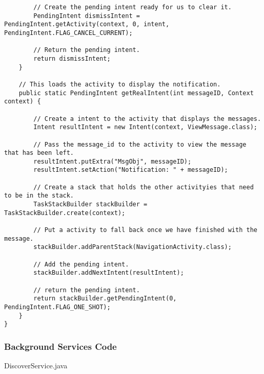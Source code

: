 \begin{lstlisting}
        // Create the pending intent ready for us to clear it.
        PendingIntent dismissIntent = PendingIntent.getActivity(context, 0, intent, PendingIntent.FLAG_CANCEL_CURRENT);

        // Return the pending intent.
        return dismissIntent;
    }

    // This loads the activity to display the notification.
    public static PendingIntent getRealIntent(int messageID, Context context) {

        // Create a intent to the activity that displays the messages.
        Intent resultIntent = new Intent(context, ViewMessage.class);

        // Pass the message_id to the activity to view the message that has been left.
        resultIntent.putExtra("MsgObj", messageID);
        resultIntent.setAction("Notification: " + messageID);

        // Create a stack that holds the other activityies that need to be in the stack.
        TaskStackBuilder stackBuilder = TaskStackBuilder.create(context);

        // Put a activity to fall back once we have finished with the message.
        stackBuilder.addParentStack(NavigationActivity.class);

        // Add the pending intent.
        stackBuilder.addNextIntent(resultIntent);

        // return the pending intent.
        return stackBuilder.getPendingIntent(0, PendingIntent.FLAG_ONE_SHOT);
    }
}

\end{lstlisting}



\subsubsection*{Background Services Code}

DiscoverService.java

